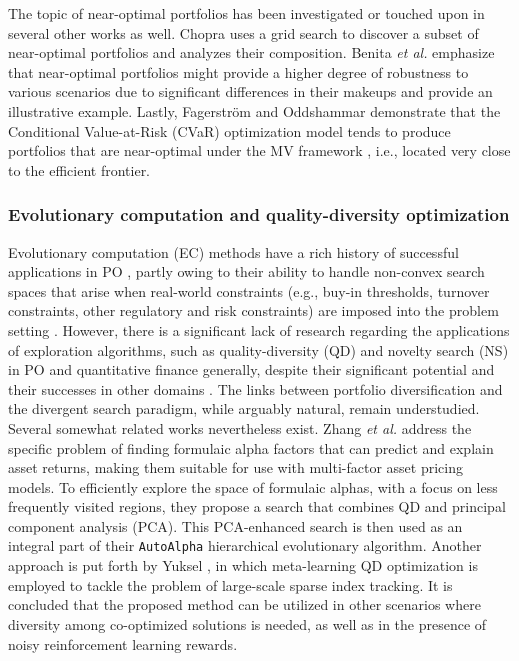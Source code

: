 The topic of near-optimal portfolios has been investigated or touched upon in several other works as well. Chopra \cite{chopra} uses a grid search to discover a subset of near-optimal portfolios and analyzes their composition. Benita \emph{et al.} \cite{benita} emphasize that near-optimal portfolios might provide a higher degree of robustness to various scenarios due to significant differences in their makeups and provide an illustrative example. Lastly, Fagerström and Oddshammar demonstrate that the Conditional Value-at-Risk (CVaR) optimization model tends to produce portfolios that are near-optimal under the MV framework \cite{fagerstrom}, i.e., located very close to the efficient frontier. 

\vspace{-0.5cm}

\subsubsection{Evolutionary computation and quality-diversity optimization} Evolutionary computation (EC) methods have a rich history of successful applications in PO \cite{brabazon}, partly owing to their ability to handle non-convex search spaces that arise when real-world constraints (e.g., buy-in thresholds, turnover constraints, other regulatory and risk constraints) are imposed into the problem setting \cite{branke,qi}. However, there is a significant lack of research regarding the applications of exploration algorithms, such as quality-diversity (QD) \cite{chatz} and novelty search (NS) \cite{lehman} in PO and quantitative finance generally, despite their significant potential and their successes in other domains \cite{gomes2013evolution, pugh2016quality}. The links between portfolio diversification and the divergent search paradigm, while arguably natural, remain understudied. Several somewhat related works nevertheless exist. Zhang \emph{et al.} \cite{zhang} address the specific problem of finding formulaic alpha factors that can predict and explain asset returns, making them suitable for use with multi-factor asset pricing models. To efficiently explore the space of formulaic alphas, with a focus on less frequently visited regions, they propose a search that combines QD and principal component analysis (PCA). This PCA-enhanced search is then used as an integral part of their \verb|AutoAlpha| hierarchical evolutionary algorithm. Another approach is put forth by Yuksel \cite{yuksel}, in which meta-learning QD optimization is employed to tackle the problem of large-scale sparse index tracking. It is concluded that the proposed method can be utilized in other scenarios where diversity among co-optimized solutions is needed, as well as in the presence of noisy reinforcement learning rewards.


